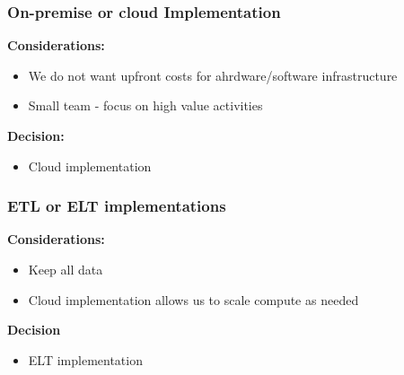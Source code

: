 \subsubsection{On-premise or cloud Implementation}
\textbf{Considerations:}
\begin{itemize}
    \item We do not want upfront costs for ahrdware/software infrastructure
    \item Small team - focus on high value activities
\end{itemize}
\textbf{Decision:}
\begin{itemize}
    \item Cloud implementation
\end{itemize}

\subsubsection{ETL or ELT implementations}
\textbf{Considerations:}
\begin{itemize}
    \item Keep all data
    \item Cloud implementation allows us to scale compute as needed
\end{itemize}
\textbf{Decision}
\begin{itemize}
    \item ELT implementation
\end{itemize}
